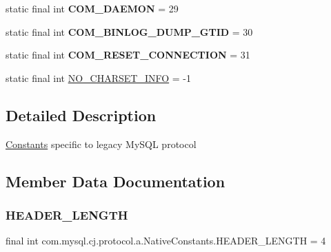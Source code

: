 \begin{DoxyCompactItemize}
\mbox{\label{classcom_1_1mysql_1_1cj_1_1protocol_1_1a_1_1_native_constants_ab6e455043896725abd66e4d2f979274e}} 
static final int {\bfseries C\+O\+M\+\_\+\+D\+A\+E\+M\+ON} = 29
\item 
\mbox{\label{classcom_1_1mysql_1_1cj_1_1protocol_1_1a_1_1_native_constants_ad2333f754ac12d8c7c51cbf4eddf0901}} 
static final int {\bfseries C\+O\+M\+\_\+\+B\+I\+N\+L\+O\+G\+\_\+\+D\+U\+M\+P\+\_\+\+G\+T\+ID} = 30
\item 
\mbox{\label{classcom_1_1mysql_1_1cj_1_1protocol_1_1a_1_1_native_constants_ae07d7658c50e62db715cc6d3281aecbf}} 
static final int {\bfseries C\+O\+M\+\_\+\+R\+E\+S\+E\+T\+\_\+\+C\+O\+N\+N\+E\+C\+T\+I\+ON} = 31
\item 
static final int \mbox{\hyperlink{classcom_1_1mysql_1_1cj_1_1protocol_1_1a_1_1_native_constants_a0f6cae1c28c039be213a26bf86340106}{N\+O\+\_\+\+C\+H\+A\+R\+S\+E\+T\+\_\+\+I\+N\+FO}} = -\/1
\end{DoxyCompactItemize}


\subsection{Detailed Description}
\mbox{\hyperlink{classcom_1_1mysql_1_1cj_1_1_constants}{Constants}} specific to legacy My\+S\+QL protocol 

\subsection{Member Data Documentation}
\mbox{\label{classcom_1_1mysql_1_1cj_1_1protocol_1_1a_1_1_native_constants_ac435707deb353a6f568e64fcc8048c93}} 
\subsubsection{\texorpdfstring{H\+E\+A\+D\+E\+R\+\_\+\+L\+E\+N\+G\+TH}{HEADER\_LENGTH}}
{\footnotesize\ttfamily final int com.\+mysql.\+cj.\+protocol.\+a.\+Native\+Constants.\+H\+E\+A\+D\+E\+R\+\_\+\+L\+E\+N\+G\+TH = 4\hspace{0.3cm}{\ttfamily [static]}}

